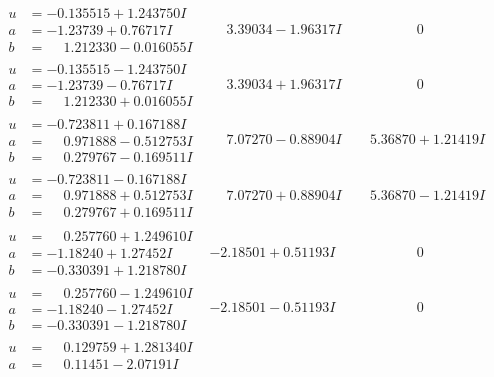 \documentclass[1p]{elsarticle_modified}
\theoremstyle{definition}
\begin{document}
$$\begin{array}{c|c|c}
 \hline 
\begin{aligned}
u &= -0.135515 + 1.243750 I \\
a &= -1.23739 + 0.76717 I \\
b &= \phantom{-}1.212330 - 0.016055 I\end{aligned}
 & \phantom{-}3.39034 - 1.96317 I & \phantom{-0.000000 } 0 \\ \hline\begin{aligned}
u &= -0.135515 - 1.243750 I \\
a &= -1.23739 - 0.76717 I \\
b &= \phantom{-}1.212330 + 0.016055 I\end{aligned}
 & \phantom{-}3.39034 + 1.96317 I & \phantom{-0.000000 } 0 \\ \hline\begin{aligned}
u &= -0.723811 + 0.167188 I \\
a &= \phantom{-}0.971888 - 0.512753 I \\
b &= \phantom{-}0.279767 - 0.169511 I\end{aligned}
 & \phantom{-}7.07270 - 0.88904 I & \phantom{-}5.36870 + 1.21419 I \\ \hline\begin{aligned}
u &= -0.723811 - 0.167188 I \\
a &= \phantom{-}0.971888 + 0.512753 I \\
b &= \phantom{-}0.279767 + 0.169511 I\end{aligned}
 & \phantom{-}7.07270 + 0.88904 I & \phantom{-}5.36870 - 1.21419 I \\ \hline\begin{aligned}
u &= \phantom{-}0.257760 + 1.249610 I \\
a &= -1.18240 + 1.27452 I \\
b &= -0.330391 + 1.218780 I\end{aligned}
 & -2.18501 + 0.51193 I & \phantom{-0.000000 } 0 \\ \hline\begin{aligned}
u &= \phantom{-}0.257760 - 1.249610 I \\
a &= -1.18240 - 1.27452 I \\
b &= -0.330391 - 1.218780 I\end{aligned}
 & -2.18501 - 0.51193 I & \phantom{-0.000000 } 0 \\ \hline\begin{aligned}
u &= \phantom{-}0.129759 + 1.281340 I \\
a &= \phantom{-}0.11451 - 2.07191 I \\

\end{aligned}
\end{array}$$
\end{document}
